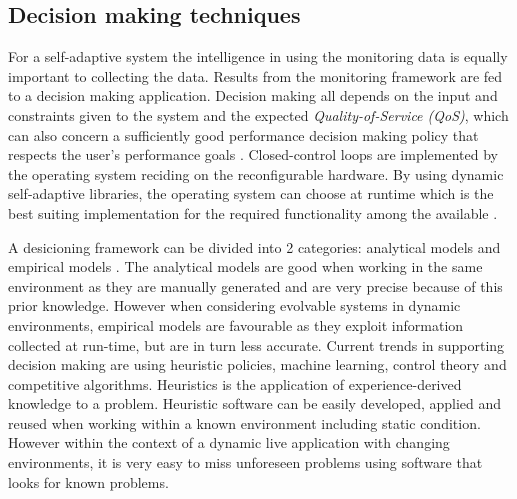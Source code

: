 \subsection{Decision making techniques}
\label{sec:decisions}

For a self-adaptive system the intelligence in using the monitoring data is equally important to collecting the data. Results from the monitoring framework are fed to a decision making application.  Decision making all depends on the input and constraints given to the system and the expected \emph{Quality-of-Service (QoS)}, which can also concern a sufficiently good performance decision making policy that respects the user's performance goals \cite{evolvable}. Closed-control loops are implemented by the operating system reciding on the reconfigurable hardware. By using dynamic self-adaptive libraries, the operating system can choose at runtime which is the best suiting implementation for the required functionality among the available \cite{evolvable}.

A desicioning framework can be divided into 2 categories: analytical models and empirical models \cite{evolvable}. The analytical models are good when working in the same environment as they are manually generated and are very precise because of this prior knowledge. However when considering evolvable systems in dynamic environments, empirical models are favourable as they exploit information collected at run-time, but are in turn less accurate.
Current trends in supporting decision making are using heuristic policies, machine learning, control theory and competitive algorithms. Heuristics is the application of experience-derived knowledge to a problem. Heuristic software can be easily developed, applied and reused when working within a known environment including static condition. However within the context of a dynamic live application with changing environments, it is very easy to miss unforeseen problems using software that looks for known problems.

